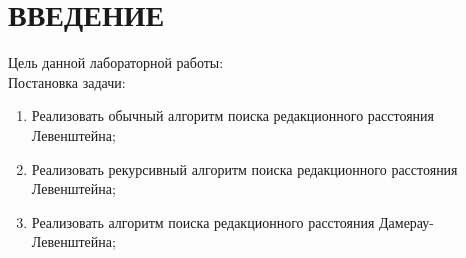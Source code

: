 \newpage
\section{ВВЕДЕНИЕ}
\begin{flushleft}
Цель данной лабораторной работы:\\
Постановка задачи:\\
\begin{enumerate}
\item Реализовать обычный алгоритм поиска редакционного расстояния Левенштейна;
\item Реализовать рекурсивный алгоритм поиска редакционного расстояния Левенштейна;
\item Реализовать алгоритм поиска редакционного расстояния Дамерау-Левенштейна;
\end{enumerate}
\end{flushleft}